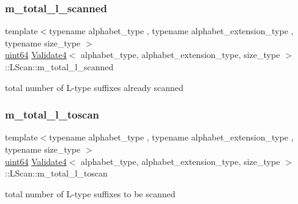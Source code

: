 \mbox{\label{struct_validate4_1_1_l_scan_aa9addcdfacecc8d69159683c9f694bef}} 
\subsubsection{\texorpdfstring{m\+\_\+total\+\_\+l\+\_\+scanned}{m\_total\_l\_scanned}}
{\footnotesize\ttfamily template$<$typename alphabet\+\_\+type , typename alphabet\+\_\+extension\+\_\+type , typename size\+\_\+type $>$ \\
\hyperlink{types_8h_a60e8696a4678cd348e991a1f172e53f7}{uint64} \hyperlink{class_validate4}{Validate4}$<$ alphabet\+\_\+type, alphabet\+\_\+extension\+\_\+type, size\+\_\+type $>$\+::L\+Scan\+::m\+\_\+total\+\_\+l\+\_\+scanned\hspace{0.3cm}{\ttfamily [private]}}



total number of L-\/type suffixes already scanned 

\mbox{\label{struct_validate4_1_1_l_scan_a400a5151679cb9c9da110cf565e81652}} 
\subsubsection{\texorpdfstring{m\+\_\+total\+\_\+l\+\_\+toscan}{m\_total\_l\_toscan}}
{\footnotesize\ttfamily template$<$typename alphabet\+\_\+type , typename alphabet\+\_\+extension\+\_\+type , typename size\+\_\+type $>$ \\
\hyperlink{types_8h_a60e8696a4678cd348e991a1f172e53f7}{uint64} \hyperlink{class_validate4}{Validate4}$<$ alphabet\+\_\+type, alphabet\+\_\+extension\+\_\+type, size\+\_\+type $>$\+::L\+Scan\+::m\+\_\+total\+\_\+l\+\_\+toscan\hspace{0.3cm}{\ttfamily [private]}}



total number of L-\/type suffixes to be scanned 

